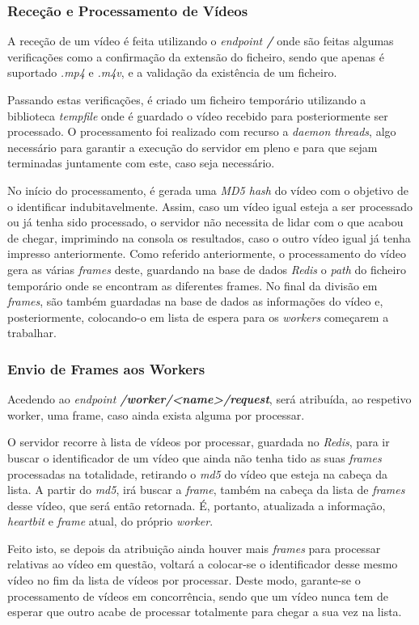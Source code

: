 \documentclass[10pt,portuguese]{article}
\begin{document}
\subsubsection{Receção e Processamento de Vídeos}
\par A receção de um vídeo é feita utilizando o \textit{endpoint \textbf{/}} onde são feitas algumas verificações como a confirmação da extensão do ficheiro, sendo que apenas é suportado \textit{.mp4} e \textit{.m4v}, e a validação da existência de um ficheiro.

\par Passando estas verificações, é criado um ficheiro temporário utilizando a biblioteca \textit{tempfile} onde é guardado o vídeo recebido para posteriormente ser processado. O processamento foi realizado com recurso a \textit{daemon threads}, algo necessário para garantir a execução do servidor em pleno e para que sejam terminadas juntamente com este, caso seja necessário.

\par No início do processamento, é gerada uma \textit{MD5 hash} do vídeo com o objetivo de o identificar indubitavelmente. Assim, caso um vídeo igual esteja a ser processado ou já tenha sido processado, o servidor não necessita de lidar com o que acabou de chegar, imprimindo na consola os resultados, caso o outro vídeo igual já tenha impresso anteriormente. 
Como referido anteriormente, o processamento do vídeo gera as várias \textit{frames} deste, guardando na base de dados  \textit{Redis} o \textit{path} do ficheiro temporário onde se encontram as diferentes frames. No final da divisão em \textit{frames}, são também guardadas na base de dados as informações do vídeo e, posteriormente, colocando-o em lista de espera para os \textit{workers} começarem a trabalhar.

\subsubsection{Envio de Frames aos Workers}
\par Acedendo ao \textit{endpoint \textbf{/worker/<name>/request}}, será atribuída, ao respetivo worker, uma frame, caso ainda exista alguma por processar.
\par O servidor recorre à lista de vídeos por processar, guardada no \textit{Redis}, para ir buscar o identificador de um vídeo que ainda não tenha tido as suas \textit{frames} processadas na totalidade, retirando o \textit{md5} do vídeo que esteja na cabeça da lista. A partir do \textit{md5}, irá buscar a \textit{frame}, também na cabeça da lista de \textit{frames} desse vídeo, que será então retornada. É, portanto, atualizada a informação, \textit{heartbit} e \textit{frame} atual, do próprio \textit{worker}. 
\par Feito isto, se depois da atribuição ainda houver mais \textit{frames} para processar relativas ao vídeo em questão, voltará a colocar-se o identificador desse mesmo vídeo no fim da lista de vídeos por processar. Deste modo, garante-se o processamento de vídeos em concorrência, sendo que um vídeo nunca tem de esperar que outro acabe de processar totalmente para chegar a sua vez na lista.
\end{document}
